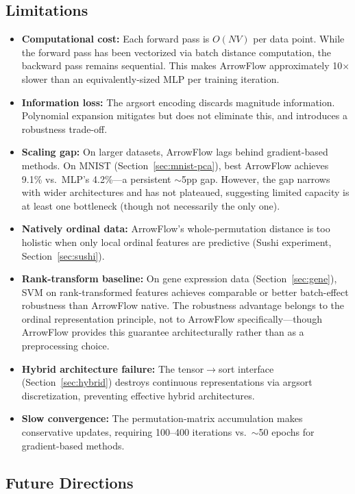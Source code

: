 \documentclass[12pt]{article}
\begin{document}
\subsection{Limitations}

\begin{itemize}[leftmargin=2em]
  \item \textbf{Computational cost:} Each forward pass is $O(NV)$ per data point. While the forward pass has been vectorized via batch distance computation, the backward pass remains sequential. This makes ArrowFlow approximately 10$\times$ slower than an equivalently-sized MLP per training iteration.
  \item \textbf{Information loss:} The argsort encoding discards magnitude information. Polynomial expansion mitigates but does not eliminate this, and introduces a robustness trade-off.
  \item \textbf{Scaling gap:} On larger datasets, ArrowFlow lags behind gradient-based methods. On MNIST (Section~\ref{sec:mnist-pca}), best ArrowFlow achieves 9.1\% vs.\ MLP's 4.2\%---a persistent $\sim$5pp gap. However, the gap narrows with wider architectures and has not plateaued, suggesting limited capacity is at least one bottleneck (though not necessarily the only one).
  \item \textbf{Natively ordinal data:} ArrowFlow's whole-permutation distance is too holistic when only local ordinal features are predictive (Sushi experiment, Section~\ref{sec:sushi}).
  \item \textbf{Rank-transform baseline:} On gene expression data (Section~\ref{sec:gene}), SVM on rank-transformed features achieves comparable or better batch-effect robustness than ArrowFlow native. The robustness advantage belongs to the ordinal representation principle, not to ArrowFlow specifically---though ArrowFlow provides this guarantee architecturally rather than as a preprocessing choice.
  \item \textbf{Hybrid architecture failure:} The tensor$\to$sort interface (Section~\ref{sec:hybrid}) destroys continuous representations via argsort discretization, preventing effective hybrid architectures.
  \item \textbf{Slow convergence:} The permutation-matrix accumulation makes conservative updates, requiring 100--400 iterations vs.\ $\sim$50 epochs for gradient-based methods.
\end{itemize}

\subsection{Future Directions}
\label{sec:future}
\end{document}
